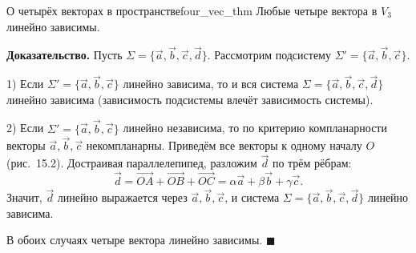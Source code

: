 \documentclass[12pt,a4paper]{article}
\newenvironment{myproof}{\noindent\textbf{Доказательство.}}{\hfill$\blacksquare$}
\begin{document}
\begin{theorem}{О четырёх векторах в пространстве}{four_vec_thm}
  Любые четыре вектора в $V_3$ линейно зависимы.
\end{theorem}

\begin{myproof}
  Пусть $\Sigma = \{\vec{a}, \vec{b}, \vec{c}, \vec{d}\}$. Рассмотрим
  подсистему $\Sigma' = \{\vec{a}, \vec{b}, \vec{c}\}$.

1) Если $\Sigma' = \{\vec{a}, \vec{b}, \vec{c}\}$ линейно зависима, то и
вся система $\Sigma = \{\vec{a}, \vec{b}, \vec{c}, \vec{d}\}$ линейно
зависима (зависимость подсистемы влечёт зависимость системы).

2) Если $\Sigma' = \{\vec{a}, \vec{b}, \vec{c}\}$ линейно независима, то
по критерию компланарности векторы $\vec{a}, \vec{b}, \vec{c}$
некомпланарны. Приведём все векторы к одному началу $O$
(рис.~15.2). Достраивая параллелепипед, разложим $\vec{d}$ по
трём рёбрам:
\[
\vec{d} = \overrightarrow{OA} + \overrightarrow{OB} +
\overrightarrow{OC} = \alpha\vec{a} + \beta\vec{b} + \gamma\vec{c}.
\]
Значит, $\vec{d}$ линейно выражается через $\vec{a}, \vec{b}, \vec{c}$,
и система $\Sigma = \{\vec{a}, \vec{b}, \vec{c}, \vec{d}\}$ линейно
зависима.

В обоих случаях четыре вектора линейно зависимы.
\end{myproof}
\end{document}
